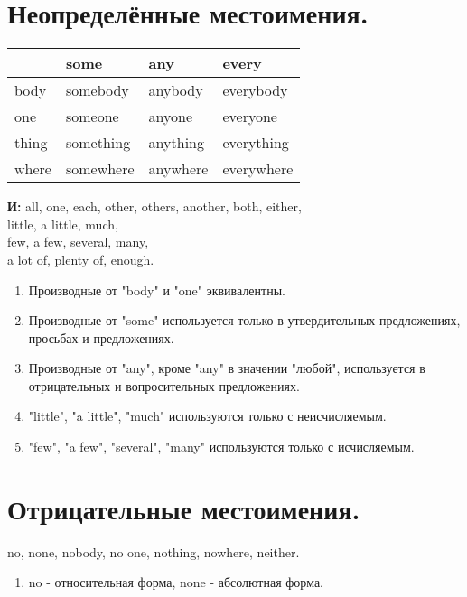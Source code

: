 \documentclass[oneside]{book}
\begin{document}
	\section{Неопределённые местоимения.}
	\begin{center}
		\begin{tabular}{|l|l|l|l|}
		\hline
			  & some      & any      & every      \\ \hline
		body  & somebody  & anybody  & everybody  \\ \hline
		one   & someone   & anyone   & everyone   \\ \hline
		thing & something & anything & everything \\ \hline
		where & somewhere & anywhere & everywhere \\ \hline
		\end{tabular}
	\end{center}

	\textbf{И:} all, one, each, other, others, another,
	both, either,
	\\
	little, a little, much,
	\\
	few, a few, several, many,
	\\
	a lot of, plenty of, enough.

	\begin{enumerate}
		\item Производные от "body" и "one" эквивалентны.
		
		\item Производные от "some" используется только в
		утвердительных предложениях, просьбах и предложениях.

		\item Производные от "any"{}, кроме "any" в значении
		"любой"{}, используется в отрицательных
		и вопросительных предложениях.

		\item "little"{}, "a little"{}, "much" используются только
		с неисчисляемым.

		\item "few"{}, "a few"{}, "several"{}, "many" используются
		только с исчисляемым.
	\end{enumerate}

	\section{Отрицательные местоимения.}
	no, none, nobody, no one, nothing, nowhere,
	neither.

	\begin{enumerate}
		\item no - относительная форма,
		none - абсолютная форма.
	\end{enumerate}
\end{document}
